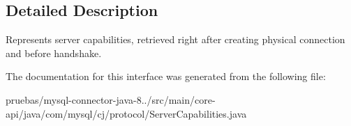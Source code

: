 \subsection{Detailed Description}
Represents server capabilities, retrieved right after creating physical connection and before handshake. 

The documentation for this interface was generated from the following file\+:\begin{DoxyCompactItemize}
\item 
pruebas/mysql-\/connector-\/java-\/8../src/main/core-\/api/java/com/mysql/cj/protocol/Server\+Capabilities.\+java\end{DoxyCompactItemize}
